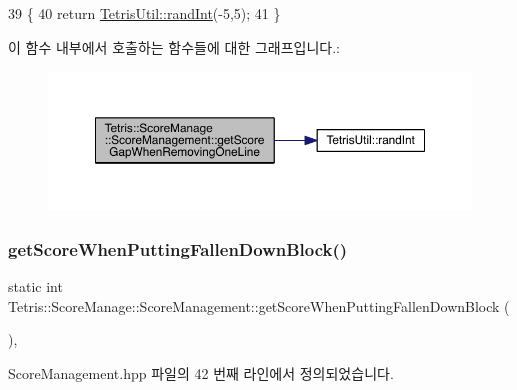 \begin{DoxyCode}
39                                                            \{
40                     \textcolor{keywordflow}{return} \hyperlink{class_tetris_util_a0a60e809425ddb416a500bcc03cf7061}{TetrisUtil::randInt}(-5,5);
41                 \}
\end{DoxyCode}
이 함수 내부에서 호출하는 함수들에 대한 그래프입니다.\+:
\nopagebreak
\begin{figure}[H]
\begin{center}
\leavevmode
\includegraphics[width=350pt]{d9/d94/class_tetris_1_1_score_manage_1_1_score_management_a2991c1eb0595da71788aba706e0b27b7_cgraph}
\end{center}
\end{figure}
\mbox{\label{class_tetris_1_1_score_manage_1_1_score_management_a275253fb7c1bb1820ddba3b666b9db09}} 
\subsubsection{\texorpdfstring{get\+Score\+When\+Putting\+Fallen\+Down\+Block()}{getScoreWhenPuttingFallenDownBlock()}}
{\footnotesize\ttfamily static int Tetris\+::\+Score\+Manage\+::\+Score\+Management\+::get\+Score\+When\+Putting\+Fallen\+Down\+Block (\begin{DoxyParamCaption}{ }\end{DoxyParamCaption})\hspace{0.3cm}{\ttfamily [inline]}, {\ttfamily [static]}}



Score\+Management.\+hpp 파일의 42 번째 라인에서 정의되었습니다.


